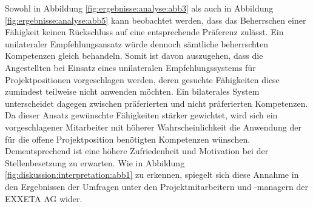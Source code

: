 Sowohl in Abbildung \ref{fig:ergebnisse:analyse:abb3} als auch in Abbildung \ref{fig:ergebnisse:analyse:abb5} kann beobachtet werden, dass das Beherrschen einer Fähigkeit keinen Rückschluss auf eine entsprechende Präferenz zulässt. Ein unilateraler Empfehlungsansatz würde dennoch sämtliche beherrschten Kompetenzen gleich behandeln. Somit ist davon auszugehen, dass die Angestellten bei Einsatz eines unilateralen Empfehlungssystems für Projektpositionen vorgeschlagen werden, deren gesuchte Fähigkeiten diese zumindest teilweise nicht anwenden möchten. Ein bilaterales System unterscheidet dagegen zwischen präferierten und nicht präferierten Kompetenzen. Da dieser Ansatz gewünschte Fähigkeiten stärker gewichtet, wird sich ein vorgeschlagener Mitarbeiter mit höherer Wahrscheinlichkeit die Anwendung der für die offene Projektposition benötigten Kompetenzen wünschen. Dementsprechend ist eine höhere Zufriedenheit und Motivation bei der Stellenbesetzung zu erwarten. Wie in Abbildung \ref{fig:diskussion:interpretation:abb1} zu erkennen, spiegelt sich diese Annahme in den Ergebnissen der Umfragen unter den Projektmitarbeitern und -managern der EXXETA AG wider.

